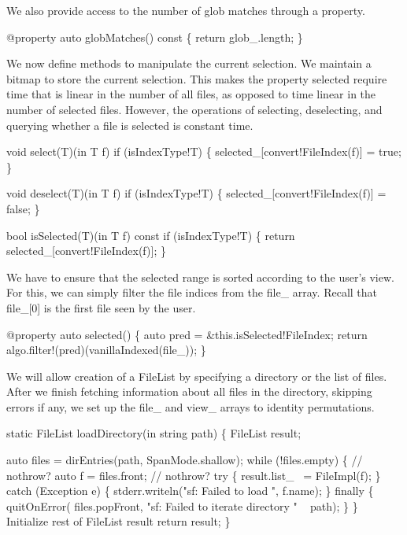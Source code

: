 \nwendcode{}We also provide access to the number of glob matches through a
property.

\nwenddocs{}\plusendmoddef\nwstartdeflinemarkup\nwenddeflinemarkup
@property
auto globMatches() const
\{
  return glob_.length;
\}

\nwendcode{}We now define methods to manipulate the current selection. We
maintain a bitmap to store the current selection. This makes the
property {\Tt{}selected\nwendquote} require time that is linear in the number of all
files, as opposed to time linear in the number of selected
files. However, the operations of selecting, deselecting, and querying
whether a file is selected is constant time.

\nwenddocs{}\plusendmoddef\nwstartdeflinemarkup\nwenddeflinemarkup
void select(T)(in T f) if (isIndexType!T)
\{
  selected_[convert!FileIndex(f)] = true;
\}

void deselect(T)(in T f) if (isIndexType!T)
\{
  selected_[convert!FileIndex(f)] = false;
\}

bool isSelected(T)(in T f) const if (isIndexType!T)
\{
  return selected_[convert!FileIndex(f)];
\}

\nwendcode{}We have to ensure that the {\Tt{}selected\nwendquote} range is sorted according to
the user's view. For this, we can simply filter the file indices from
the {\Tt{}file{\_}\nwendquote} array. Recall that {\Tt{}file{\_}[0]\nwendquote} is the first file seen
by the user.

\nwenddocs{}\plusendmoddef\nwstartdeflinemarkup\nwenddeflinemarkup
@property
auto selected()
\{
  auto pred = &this.isSelected!FileIndex;
  return algo.filter!(pred)(vanillaIndexed(file_));
\}

\nwendcode{}We will allow creation of a {\Tt{}FileList\nwendquote} by specifying a directory
or the list of files. After we finish fetching information about all
files in the directory, skipping errors if any, we set up the
{\Tt{}file{\_}\nwendquote} and {\Tt{}view{\_}\nwendquote} arrays to identity permutations.

\nwenddocs{}\endmoddef\nwstartdeflinemarkup\nwenddeflinemarkup
static FileList loadDirectory(in string path)
\{
  FileList result;

  auto files = dirEntries(path, SpanMode.shallow);
  while (!files.empty) \{ // nothrow?
    auto f = files.front; // nothrow?
    try \{
      result.list_ ~= FileImpl(f);
    \} catch (Exception e) \{
      stderr.writeln("sf: Failed to load ", f.name);
    \} finally \{
      quitOnError(
        files.popFront,
        "sf: Failed to iterate directory " ~ path);
    \}
  \}
  \LA{}Initialize rest of FileList result\RA{}
  return result;
\}

